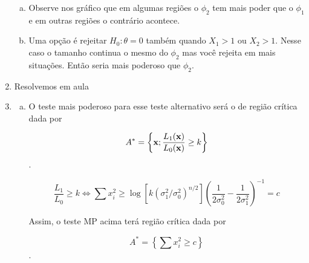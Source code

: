 \documentclass[10pt,brazil]{exam}
\begin{document}
\begin{enumerate}[1.]
\begin{enumerate}[a)]
\item  Observe nos gráfico que em algumas regiões o $\phi_2$   tem mais poder que o $\phi_1$ e em outras regiões o contrário acontece.

\item %

Uma opção é rejeitar $H_0:\theta=0$ também quando $X_1>1$ ou $X_2> 1$. Nesse caso o tamanho continua o mesmo do $\phi_2$ mas você rejeita em mais situações. Então seria mais poderoso que $\phi_2$.

\end{enumerate}


\medskip
\item  Resolvemos em aula
%
%
%



\medskip
\item %
%
\begin{enumerate}[a)] 
\item %
O teste mais poderoso para esse teste alternativo será o de região crítica dada por

\[A^*=\left\{{\bf x};\frac{L_1({\bf x})}{L_0({\bf x})}\geq k\right\}\].

\[\frac{L_1}{L_0}\geq k \Leftrightarrow  \sum x_i^2\geq \log\left[k(\sigma_1^2/\sigma_0^2)^{n/2}\right]\left(\frac{1}{2\sigma_0^2}-\frac{1}{2\sigma_1^2}\right)^{-1}=c \]

Assim, o teste MP acima terá região crítica dada por 

\[A^*=\left\{\sum x_i ^2 \geq c\right\}\].


\end{enumerate}
\end{enumerate}
\end{document}
